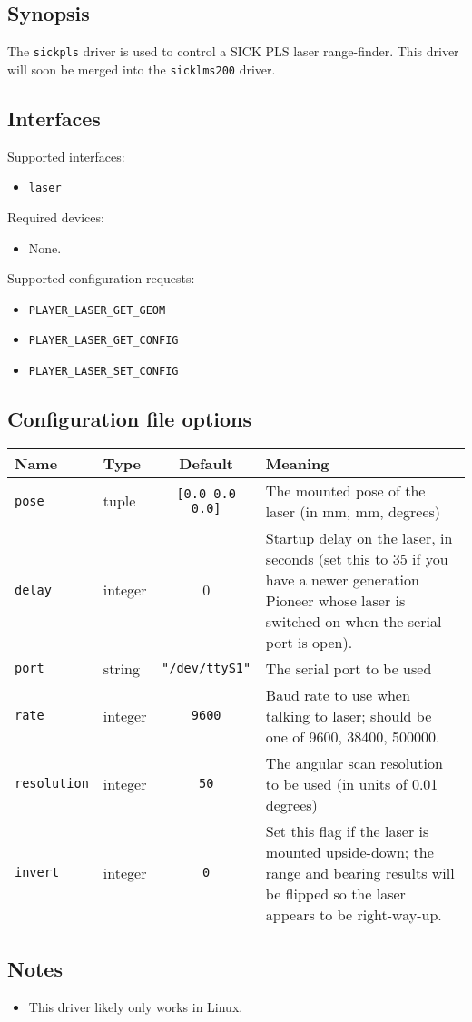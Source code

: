 \subsection*{Synopsis}
The {\tt sickpls} driver is used to control a SICK PLS laser range-finder.
This driver will soon be merged into the {\tt sicklms200} driver.

\subsection*{Interfaces}

\noindent Supported interfaces:
\begin{itemize}
\item {\tt laser}
\end{itemize}

\noindent Required devices:
\begin{itemize}
\item None.
\end{itemize}

\noindent Supported configuration requests:
\begin{itemize}
\item \verb+PLAYER_LASER_GET_GEOM+
\item \verb+PLAYER_LASER_GET_CONFIG+
\item \verb+PLAYER_LASER_SET_CONFIG+
\end{itemize}


\subsection*{Configuration file options}

\begin{center}
{\small \begin{tabularx}{\columnwidth}{|l|l|c|X|}
\hline
Name & Type & Default & Meaning\\
\hline
{\tt pose} & tuple & {\tt [0.0 0.0 0.0]} & The mounted pose of the laser (in mm,
mm, degrees)\\
{\tt delay} & integer & 0 & Startup delay on the laser, in seconds (set this to 35 if you
have a newer generation Pioneer whose laser is switched on when the serial port is open). \\
{\tt port} & string & {\tt "/dev/ttyS1"} & The serial port to be used\\
{\tt rate} & integer & {\tt 9600} & Baud rate to use when talking to
laser; should be one of 9600, 38400, 500000.\\
{\tt resolution} & integer & {\tt 50} & The angular scan resolution to be used
(in units of 0.01 degrees)\\
{\tt invert} & integer & {\tt 0} & Set this flag if the laser is mounted upside-down; the range
and bearing results will be flipped so the laser appears to be right-way-up.\\
\hline
\end{tabularx}}
\end{center}

\subsection*{Notes}

\begin{itemize}
\item This driver likely only works in Linux.
\end{itemize}
